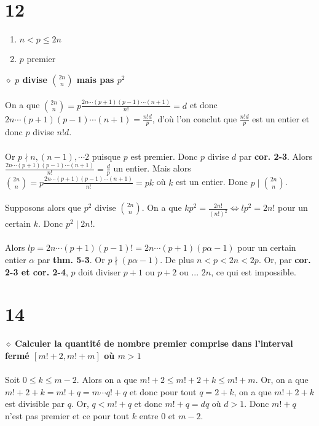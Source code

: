 \documentclass[a4paper,10pt]{article}
\begin{document}
\section*{12}
\begin{enumerate}
	\item $n < p \leq 2n$
	\item $p$ premier
\end{enumerate}
$\diamond$ \textbf{$p$ divise $\binom{2n}{n}$ mais pas $p^2$}
\\
\\
On a que $\binom{2n}{n} = p \frac{2n \cdots (p+1)(p-1) \cdots (n+1)}{n!} = d$ et donc $2n \cdots (p+1)(p-1) \cdots (n+1) = \frac{n!d}{p}$, d'où l'on conclut que $\frac{n!d}{p}$ est un entier et donc $p$ divise $n!d$.
\\
\\
Or $p \nmid n, (n-1), \cdots 2$ puisque $p$ est premier. Donc $p$ divise $d$ par \textbf{cor. 2-3}. Alors $\frac{2n \cdots (p+1)(p-1) \cdots (n+1)}{n!} = \frac{d}{p}$ un entier. Mais alors $\binom{2n}{n} = p \frac{2n \cdots (p+1)(p-1) \cdots (n+1)}{n!} = pk$ où $k$ est un entier. Donc $p \mid \binom{2n}{n}$.
\\
\\
Supposons alors que $p^2$ divise $\binom{2n}{n}$. On a que $kp^2 = \frac{2n!}{(n!)^2} \Leftrightarrow lp^2 = 2n!$ pour un certain $k$. Donc $p^2 \mid 2n!$.
\\
\\
Alors $lp = 2n \cdots (p+1)(p-1)! = 2n \cdots (p+1)(p\alpha -1)$ pour un certain entier $\alpha$ par \textbf{thm. 5-3}. Or $p \nmid (p\alpha - 1)$. De plus $n < p < 2n < 2p$. Or, par \textbf{cor. 2-3 et cor. 2-4}, $p$ doit diviser $p+1$ ou $p+2$ ou ... $2n$, ce qui est impossible.

\section*{14}
$\diamond$ \textbf{Calculer la quantité de nombre premier comprise dans l'interval fermé $[m! + 2, m! + m]$ où $m > 1$}
\\
\\
Soit $0 \leq k \leq m-2$. Alors on a que $m! + 2 \leq m! + 2 + k \leq m! + m$. Or, on a que $m! + 2 + k = m! + q = m \cdots q! + q$ et donc pour tout $q = 2 +k$, on a que $m! + 2 + k$ est divisible par $q$. Or, $q < m! + q$ et donc $m! + q = dq$ où $d > 1$. Donc $m! + q$ n'est pas premier et ce pour tout $k$ entre $0$ et $m -2$.
\end{document}
